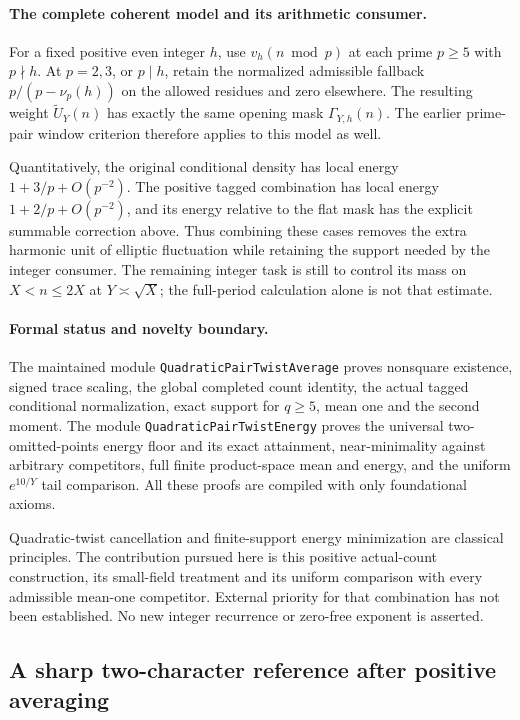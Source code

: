 \documentclass[11pt]{article}
\begin{document}
\paragraph{The complete coherent model and its arithmetic consumer.}
For a fixed positive even integer \(h\), use \(v_h(n\bmod p)\) at
each prime \(p\geq5\) with \(p\nmid h\).
At \(p=2,3\), or \(p\mid h\), retain the normalized admissible
fallback \(p/(p-\nu_p(h))\) on the allowed residues and zero elsewhere.
The resulting weight \(\widetilde U_Y(n)\) has exactly the same opening
mask \(\Gamma_{Y,h}(n)\). The earlier prime-pair window criterion
therefore applies to this model as well.

Quantitatively, the original conditional density has local energy
\(1+3/p+O(p^{-2})\). The positive tagged combination has local energy
\(1+2/p+O(p^{-2})\), and its energy relative to the flat mask has the
explicit summable correction above. Thus combining these cases removes
the extra harmonic unit of elliptic fluctuation while retaining the
support needed by the integer consumer. The remaining integer task is
still to control its mass on \(X<n\leq2X\) at
\(Y\asymp\sqrt X\); the full-period calculation alone is not that estimate.

\paragraph{Formal status and novelty boundary.}
The maintained module \texttt{QuadraticPairTwistAverage} proves
nonsquare existence, signed trace scaling, the global completed count
identity, the actual tagged conditional normalization, exact support
for \(q\geq5\), mean one and the second moment.
The module \texttt{QuadraticPairTwistEnergy} proves the universal
two-omitted-points energy floor and its exact attainment, near-minimality against arbitrary
competitors, full finite product-space mean and energy, and the
uniform \(e^{10/Y}\) tail comparison. All these proofs are compiled
with only foundational axioms.

Quadratic-twist cancellation and finite-support energy minimization
are classical principles. The contribution pursued here is this
positive actual-count construction, its small-field treatment and
its uniform comparison with every admissible mean-one competitor.
External priority for that combination has not been established.
No new integer recurrence or zero-free exponent is asserted.

\subsection{A sharp two-character reference after positive averaging}
\end{document}
